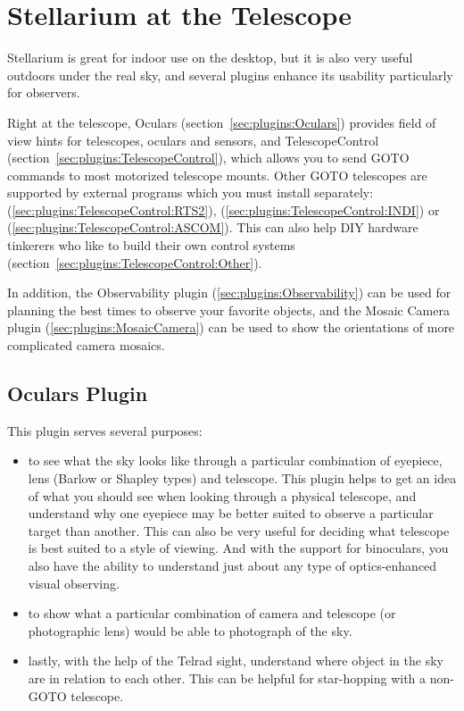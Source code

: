 \chapter{Stellarium at the Telescope}
\label{ch:atTheTelescope}

Stellarium is great for indoor use on the desktop, but it is also very
useful outdoors under the real sky, and several plugins enhance its
usability particularly for observers.

Right at the telescope, Oculars (section~\ref{sec:plugins:Oculars})
provides field of view hints for telescopes, oculars and sensors, and
TelescopeControl (section~\ref{sec:plugins:TelescopeControl}), which
allows you to send GOTO commands to most motorized telescope mounts. Other
GOTO telescopes are supported by external programs which you must
install separately:  (\ref{sec:plugins:TelescopeControl:RTS2}), 
 (\ref{sec:plugins:TelescopeControl:INDI}) or  (\ref{sec:plugins:TelescopeControl:ASCOM}). 
This can also help DIY hardware tinkerers who like to build their own control systems (section~\ref{sec:plugins:TelescopeControl:Other}).

In addition, the Observability plugin (\ref{sec:plugins:Observability})
can be used for planning the best times to observe your favorite
objects, and
the Mosaic Camera plugin (\ref{sec:plugins:MosaicCamera}) can be used to
show the orientations of more complicated camera mosaics.

\section{Oculars Plugin}
\label{sec:plugins:Oculars}

This plugin serves several purposes:
\begin{itemize}
\item to see what the sky looks like through a particular combination of eyepiece, 
  lens (Barlow or Shapley types) and telescope. This plugin helps to get an idea of 
  what you should see when looking through a physical telescope, and understand why 
  one eyepiece may be better suited to observe a particular target than another. 
  This can also be very useful for deciding what telescope is best suited to a style of viewing. 
  And with the support for binoculars, you also have the ability to understand just about any type of optics-enhanced visual observing.
\item to show what a particular combination of camera and telescope (or photographic lens) would be able to photograph of the sky. 
\item lastly, with the help of the Telrad sight, understand where object in the sky are in relation to each other. 
This can be helpful for star-hopping with a non-GOTO telescope. 
\end{itemize}

